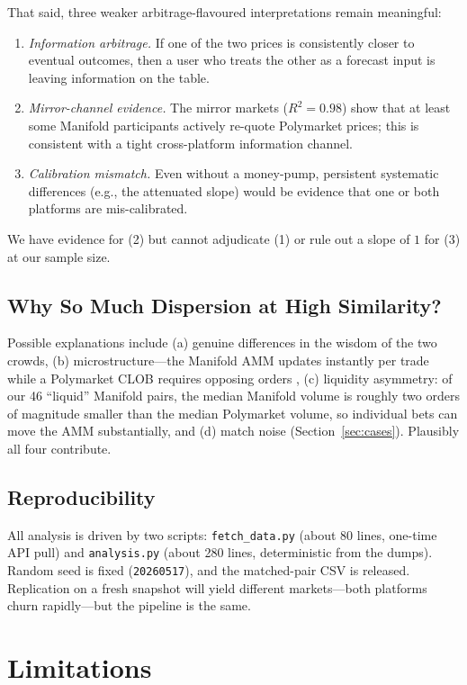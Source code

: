 \documentclass{article}
\begin{document}
That said, three weaker arbitrage-flavoured interpretations remain meaningful:
\begin{enumerate}
  \item \emph{Information arbitrage.} If one of the two prices is consistently closer to eventual outcomes, then a user who treats the other as a forecast input is leaving information on the table.
  \item \emph{Mirror-channel evidence.} The mirror markets ($R^2 = 0.98$) show that at least some Manifold participants actively re-quote Polymarket prices; this is consistent with a tight cross-platform information channel.
  \item \emph{Calibration mismatch.} Even without a money-pump, persistent systematic differences (e.g., the attenuated slope) would be evidence that one or both platforms are mis-calibrated.
\end{enumerate}

We have evidence for (2) but cannot adjudicate (1) or rule out a slope of $1$ for (3) at our sample size.

\subsection{Why So Much Dispersion at High Similarity?}

Possible explanations include (a) genuine differences in the wisdom of the two crowds, (b) microstructure---the Manifold AMM updates instantly per trade while a Polymarket CLOB requires opposing orders \citep{hanson2007lmsr}, (c) liquidity asymmetry: of our 46 ``liquid'' Manifold pairs, the median Manifold volume is roughly two orders of magnitude smaller than the median Polymarket volume, so individual bets can move the AMM substantially, and (d) match noise (Section~\ref{sec:cases}). Plausibly all four contribute.

\subsection{Reproducibility}

All analysis is driven by two scripts: \texttt{fetch\_data.py} (about 80 lines, one-time API pull) and \texttt{analysis.py} (about 280 lines, deterministic from the dumps). Random seed is fixed (\texttt{20260517}), and the matched-pair CSV is released. Replication on a fresh snapshot will yield different markets---both platforms churn rapidly---but the pipeline is the same.

\section{Limitations}
\label{sec:limits}
\end{document}
